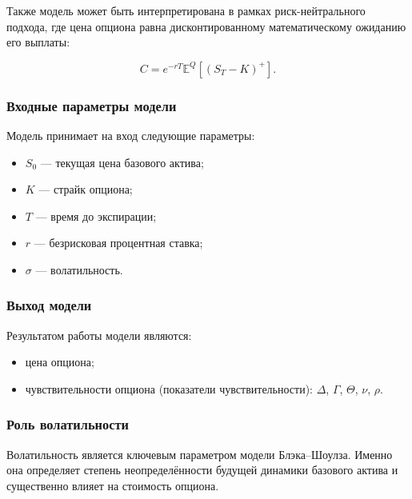 \documentclass[11pt,a4paper]{article}
\begin{document}
Также модель может быть интерпретирована в рамках риск-нейтрального подхода, где цена опциона равна дисконтированному математическому ожиданию его выплаты:

\begin{equation}
C = e^{-rT}\mathbb{E}^Q[(S_T - K)^+].
\end{equation}

\subsubsection{Входные параметры модели}

Модель принимает на вход следующие параметры:

\begin{itemize}
    \item $S_0$ --- текущая цена базового актива;
    
    \item $K$ --- страйк опциона;
    
    \item $T$ --- время до экспирации;
    
    \item $r$ --- безрисковая процентная ставка;
    
    \item $\sigma$ --- волатильность.
\end{itemize}

\subsubsection{Выход модели}

Результатом работы модели являются:

\begin{itemize}
    \item цена опциона;
    
    \item чувствительности опциона (показатели чувствительности): $\Delta$, $\Gamma$, $\Theta$, $\nu$, $\rho$.
\end{itemize}

\subsubsection{Роль волатильности}

Волатильность является ключевым параметром модели Блэка--Шоулза. Именно она определяет степень неопределённости будущей динамики базового актива и существенно влияет на стоимость опциона.
\end{document}
